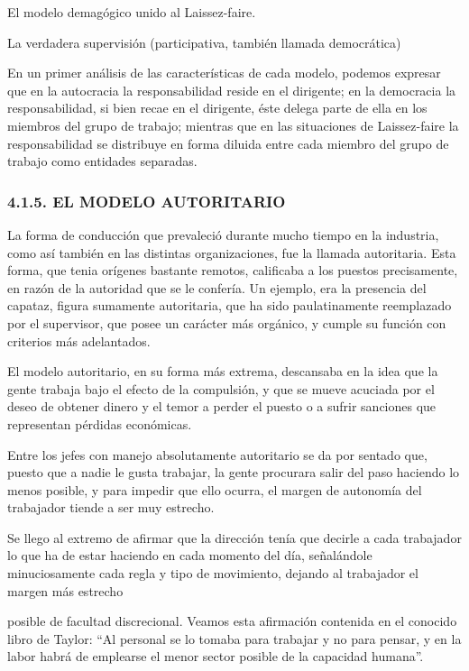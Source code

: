 El modelo demagógico unido al Laissez-faire.

La verdadera supervisión (participativa, también llamada democrática)

En un primer análisis de las características de cada modelo, podemos expresar que en la autocracia la responsabilidad reside en el dirigente; en la democracia la responsabilidad, si bien recae en el dirigente, éste delega parte de ella en los miembros del grupo de trabajo; mientras que en las situaciones de Laissez-faire la responsabilidad se distribuye en forma diluida entre cada miembro del grupo de trabajo como entidades separadas.

\subsubsection*{4.1.5. EL MODELO AUTORITARIO}
La forma de conducción que prevaleció durante mucho tiempo en la industria, como así también en las distintas organizaciones, fue la llamada autoritaria. Esta forma, que tenia orígenes bastante remotos, calificaba a los puestos precisamente, en razón de la autoridad que se le confería. Un ejemplo, era la presencia del capataz, figura sumamente autoritaria, que ha sido paulatinamente reemplazado por el supervisor, que posee un carácter más orgánico, y cumple su función con criterios más adelantados.

El modelo autoritario, en su forma más extrema, descansaba en la idea que la gente trabaja bajo el efecto de la compulsión, y que se mueve acuciada por el deseo de obtener dinero y el temor a perder el puesto o a sufrir sanciones que representan pérdidas económicas.

Entre los jefes con manejo absolutamente autoritario se da por sentado que, puesto que a nadie le gusta trabajar, la gente procurara salir del paso haciendo lo menos posible, y para impedir que ello ocurra, el margen de autonomía del trabajador tiende a ser muy estrecho.

Se llego al extremo de afirmar que la dirección tenía que decirle a cada trabajador lo que ha de estar haciendo en cada momento del día, señalándole minuciosamente cada regla y tipo de movimiento, dejando al trabajador el margen más estrecho



posible de facultad discrecional. Veamos esta afirmación contenida en el conocido libro de Taylor: “Al personal se lo tomaba para trabajar y no para pensar, y en la labor habrá de emplearse el menor sector posible de la capacidad humana”.

